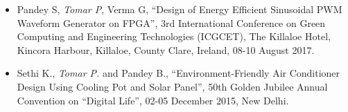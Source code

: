\begin{cvparagraph}
\begin{itemize}[label=$\S$]
\item {Pandey S, {\it Tomar P}, Verma G, “Design of Energy Efficient Sinusoidal PWM Waveform Generator on FPGA”, 3rd International Conference on Green Computing and Engineering Technologies (ICGCET), The Killaloe Hotel, Kincora Harbour, Killaloe, County Clare, Ireland, 08-10 August 2017.}

\item {Sethi K., {\it Tomar P.} and Pandey B., “Environment-Friendly Air Conditioner Design Using Cooling Pot and Solar Panel”, 50th Golden Jubilee Annual Convention on “Digital Life”, 02-05 December 2015, New Delhi.}

 
\end{itemize}


\end{cvparagraph}
